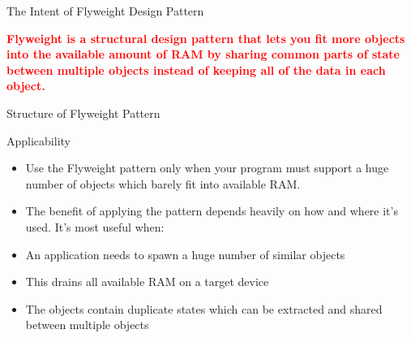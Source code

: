 \documentclass[13pt]{beamer}
\begin{document}
\begin{frame}{The Intent of Flyweight Design Pattern}
	\begin{center}
	\textcolor{red}{\textbf{Flyweight is a structural design pattern that lets you fit more objects into the available amount of RAM by sharing common parts of state between multiple objects instead of keeping all of the data in each object.}}\\
	\end{center}
\end{frame}

\begin{frame}{Structure of Flyweight Pattern}
	\begin{center}
	\end{center}
\end{frame}

\begin{frame}{Applicability}
	\begin{itemize}
		\setlength\itemsep{1em}
		\item  Use the Flyweight pattern only when your program must support a huge number of objects which barely fit into available RAM.
		\item The benefit of applying the pattern depends heavily on how and where it’s used. It’s most useful when:
		\item An application needs to spawn a huge number of similar objects
		\item This drains all available RAM on a target device
		\item The objects contain duplicate states which can be extracted and shared between multiple objects
	\end{itemize}
\end{frame}
\end{document}
